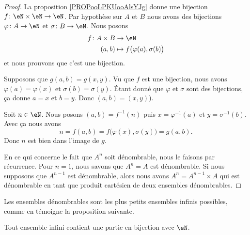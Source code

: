 \begin{proof}
	La proposition \ref{PROPooLPKUooAlsYJg} donne une bijection \(f \colon \eN\times \eN\to \eN  \). Par hypothèse sur \( A\) et \( B\) nous avons des bijections \(\varphi \colon A\to \eN  \) et \(\sigma \colon B\to \eN  \). Nous posons
	\begin{equation}
		\begin{aligned}
			f\colon A\times B & \to \eN                                    \\
			(a,b)             & \mapsto f\big( \varphi(a), \sigma(b) \big)
		\end{aligned}
	\end{equation}
	et nous prouvons que c'est une bijection.
	\begin{subproof}
		\spitem[Injectif]
		Supposons que \( g(a,b)=g(x,y)\). Vu que \( f\) est une bijection, nous avons \( \varphi(a)=\varphi(x)\) et \( \sigma(b)=\sigma(y)\). Étant donné que  \( \varphi\) et \( \sigma\) sont des bijections, ça donne \( a=x\) et \( b=y\). Donc \( (a,b)=(x,y)\)).

		\spitem[Surjectif]
		Soit \( n\in \eN\). Nous posons \( (a,b)=f^{-1}(n)\) puis \( x=\varphi^{-1}(a)\) et \( y=\sigma^{-1}(b)\). Avec ça nous avons
		\begin{equation}
			n=f(a,b)=f\big( \varphi(x),\sigma(y) \big)=g(a,b).
		\end{equation}
		Donc \( n\) est bien dans l'image de \( g\).
	\end{subproof}

	En ce qui concerne le fait que \( A^n\) soit dénombrable, nous le faisons par récurrence. Pour \( n=1\), nous savons que \( A^n=A\) est dénombrable. Si nous supposons que \( A^{n-1}\) est dénombrable, alors nous avons \( A^n=A^{n-1}\times A\) qui est dénombrable en tant que produit cartésien de deux ensembles dénombrables.
\end{proof}

Les ensembles dénombrables sont les plus petits ensembles infinis possibles, comme en témoigne la proposition suivante.
\begin{proposition}      \label{PROPooUIPAooCUEFme}
	Tout ensemble infini contient une partie en bijection avec \( \eN\).
\end{proposition}

